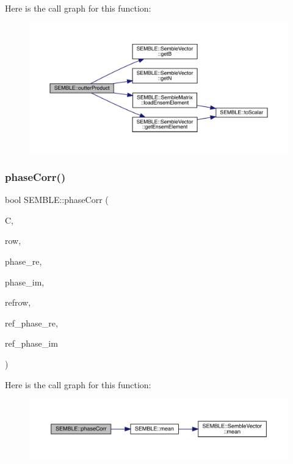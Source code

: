 Here is the call graph for this function\+:
\nopagebreak
\begin{figure}[H]
\begin{center}
\leavevmode
\includegraphics[width=350pt]{d7/dfd/namespaceSEMBLE_a2d350ec19bb9d35ba9a92cc043a06a95_cgraph}
\end{center}
\end{figure}
\mbox{\label{namespaceSEMBLE_aba48c04efaaf56c5a4400350190a4828}} 
\subsubsection{\texorpdfstring{phaseCorr()}{phaseCorr()}}
{\footnotesize\ttfamily bool S\+E\+M\+B\+L\+E\+::phase\+Corr (\begin{DoxyParamCaption}\item[{\mbox{\hyperlink{structSEMBLE_1_1SembleMatrix}{Semble\+Matrix}}$<$ std\+::complex$<$ double $>$ $>$}]{C,  }\item[{int}]{row,  }\item[{int \&}]{phase\+\_\+re,  }\item[{int \&}]{phase\+\_\+im,  }\item[{int}]{refrow,  }\item[{int}]{ref\+\_\+phase\+\_\+re,  }\item[{int}]{ref\+\_\+phase\+\_\+im }\end{DoxyParamCaption})}

Here is the call graph for this function\+:
\nopagebreak
\begin{figure}[H]
\begin{center}
\leavevmode
\includegraphics[width=350pt]{d7/dfd/namespaceSEMBLE_aba48c04efaaf56c5a4400350190a4828_cgraph}
\end{center}
\end{figure}
\mbox{\label{namespaceSEMBLE_ab37ccf132600d41472bb11c6ff531166}} 
